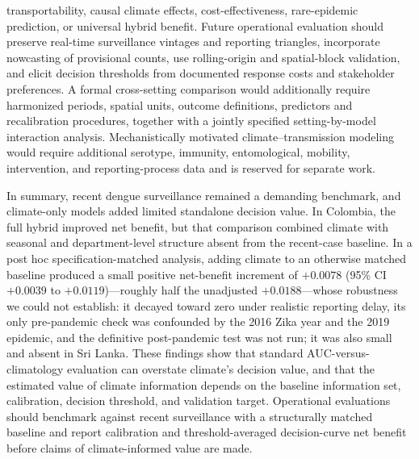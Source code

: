 \documentclass[11pt,a4paper]{article}
\begin{document}
transportability, causal climate effects, cost-effectiveness, rare-epidemic prediction, or universal hybrid benefit. Future operational evaluation should preserve real-time surveillance vintages and reporting triangles, incorporate nowcasting of provisional counts, use rolling-origin and spatial-block validation, and elicit decision thresholds from documented response costs and stakeholder preferences. A formal cross-setting comparison would additionally require harmonized periods, spatial units, outcome definitions, predictors and recalibration procedures, together with a jointly specified setting-by-model interaction analysis. Mechanistically motivated climate--transmission modeling would require additional serotype, immunity, entomological, mobility, intervention, and reporting-process data and is reserved for separate work.

In summary, recent dengue surveillance remained a demanding benchmark, and climate-only models added limited standalone decision value. In Colombia, the full hybrid improved net benefit, but that comparison combined climate with seasonal and department-level structure absent from the recent-case baseline. In a post hoc specification-matched analysis, adding climate to an otherwise matched baseline produced a small positive net-benefit increment of $+0.0078$ (95\% CI $+0.0039$ to $+0.0119$)---roughly half the unadjusted $+0.0188$---whose robustness we could not establish: it decayed toward zero under realistic reporting delay, its only pre-pandemic check was confounded by the 2016 Zika year and the 2019 epidemic, and the definitive post-pandemic test was not run; it was also small and absent in Sri Lanka. These findings show that standard AUC-versus-climatology evaluation can overstate climate's decision value, and that the estimated value of climate information depends on the baseline information set, calibration, decision threshold, and validation target. Operational evaluations should benchmark against recent surveillance with a structurally matched baseline and report calibration and threshold-averaged decision-curve net benefit before claims of climate-informed value are made.

\end{document}
